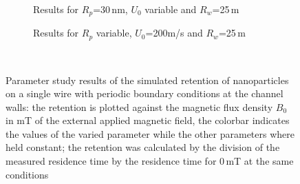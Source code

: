 \begin{figure}[H]
\begin{subfigure}{0.49\textwidth}
                  \caption{Results for $R_{p}$=30\,nm, $U_{0}$ variable and $R_{w}$=25\,\textmu m}\label{subfig:sw_periodicBC_U0_var}
          \end{subfigure}\hfill
        \begin{subfigure}{0.49\textwidth}
                \flushright
                \caption{Results for $R_{p}$ variable, $U_{0}$=200\textmu m/s and $R_{w}$=25\,\textmu m}\label{subfig:sw_periodicBC_Rp_var}
        \end{subfigure}
        \\
        
        \caption[Parameter study results of the simulated retention of nanoparticles on a single wire with a periodic boundary condition at the channel walls] {Parameter study results of the simulated retention of nanoparticles on a single wire with periodic boundary conditions at the channel walls: the retention is plotted against the magnetic flux density $B_{0}$ in mT of the external applied magnetic field, the colorbar indicates the values of the varied parameter while the other parameters where held constant; the retention was calculated by the division of the measured residence time by the residence time for 0\,mT at the same conditions}
        \label{fig:sw_param_res_periodicBC}
  \end{figure}
  
